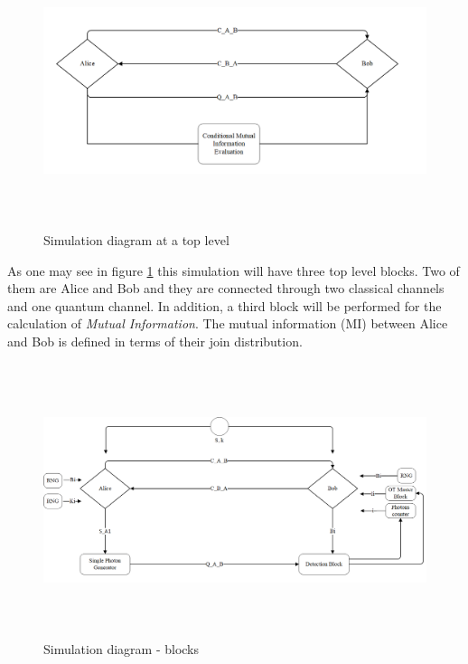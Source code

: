 \begin{figure}[H]
	\centering
	\includegraphics[width=1.0\textwidth, height=8cm]{./sdf/ot_with_discrete_variables/figures/Simulation_diagram_1.png}
	\caption{Simulation diagram at a top level}\label{toplevelsimulation}
\end{figure}

As one may see in figure \ref{toplevelsimulation} this simulation will have three top level blocks. Two of them are Alice and Bob and they are connected through two classical channels and one quantum channel. In addition, a third block will be performed for the calculation of \textit{Mutual Information}. The mutual information (MI) between Alice and Bob is defined in terms of their join distribution.

\begin{figure}[H]
	\centering
	\includegraphics[width=1.0\textwidth, height=8cm]{./sdf/ot_with_discrete_variables/figures/Simulation_diagram.png}
	\caption{Simulation diagram - blocks}\label{blocksimulation}
\end{figure}

